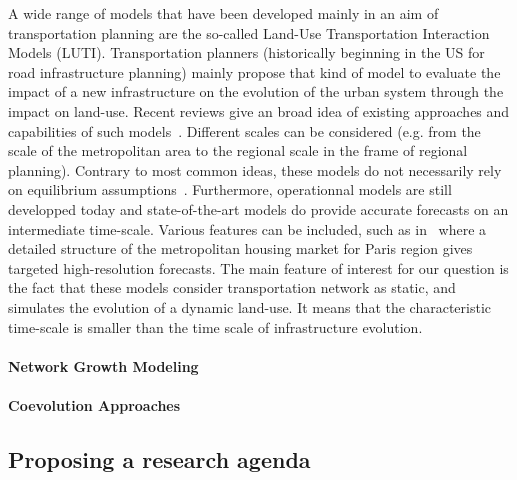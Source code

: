 A wide range of models that have been developed mainly in an aim of transportation planning are the so-called Land-Use Transportation Interaction Models (LUTI). Transportation planners (historically beginning in the US for road infrastructure planning) mainly propose that kind of model to evaluate the impact of a new infrastructure on the evolution of the urban system through the impact on land-use.
Recent reviews give an broad idea of existing approaches and capabilities of such models~\cite{chang2006models,iacono2008models,wegener2004land}. Different scales can be considered (e.g. from the scale of the metropolitan area
to the regional scale in the frame of regional planning).
Contrary to most common ideas, these models do not necessarily rely on equilibrium assumptions~\cite{kryvobokov2013comparison}. Furthermore, operationnal models are still developped today and state-of-the-art models do provide accurate forecasts on an intermediate time-scale. Various features can be included, such as in~\cite{delons:hal-00319087} where a detailed structure of the metropolitan housing market for Paris region gives targeted high-resolution forecasts. The main feature of interest for our question is the fact that these models consider transportation network as static, and simulates the evolution of a dynamic land-use. It means that the characteristic time-scale is smaller than the time scale of infrastructure evolution.


\paragraph{Network Growth Modeling}


\paragraph{Coevolution Approaches}





\subsection{Proposing a research agenda}

